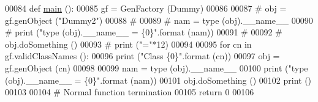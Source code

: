 \begin{DoxyCode}
00084 \textcolor{keyword}{def }\hyperlink{namespacegen__factory_a785bd40533dd477ffff224d65ba1c5c3}{main} ():
00085     gf = GenFactory (Dummy)
00086     
00087 \textcolor{comment}{#    obj = gf.genObject ("Dummy2")}
00088 \textcolor{comment}{#    }
00089 \textcolor{comment}{#    nam = type (obj).\_\_name\_\_ }
00090 \textcolor{comment}{#    print ("type (obj).\_\_name\_\_ = \{0\}".format (nam))}
00091 \textcolor{comment}{#    }
00092 \textcolor{comment}{#    obj.doSomething ()}
00093 \textcolor{comment}{#    print ("="*12)}
00094     
00095     \textcolor{keywordflow}{for} cn \textcolor{keywordflow}{in} gf.validClassNames ():
00096         \textcolor{keywordflow}{print} (\textcolor{stringliteral}{"Class \{0\}"}.format (cn))
00097         obj = gf.genObject (cn)
00098     
00099         nam = type (obj).\_\_name\_\_ 
00100         \textcolor{keywordflow}{print} (\textcolor{stringliteral}{"type (obj).\_\_name\_\_ = \{0\}"}.format (nam))
00101         obj.doSomething ()
00102         \textcolor{keywordflow}{print} ()
00103         
00104     \textcolor{comment}{# Normal function termination}
00105     \textcolor{keywordflow}{return} 0
00106 
\end{DoxyCode}
